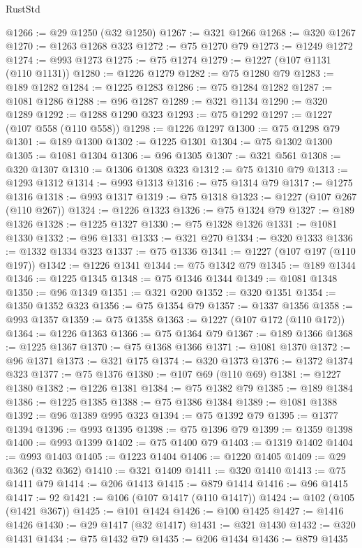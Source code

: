 \begin{lexlean}{RustStd}
\begin{coremodule}
@1266 := @29 @1250 (@32 @1250)
@1267 := @321 @1266
@1268 := @320 @1267
@1270 := @1263 @1268 @323
@1272 := @75 @1270 @79
@1273 := @1249 @1272
@1274 := @993 @1273
@1275 := @75 @1274
@1279 := @1227 (@107 @1131 (@110 @1131))
@1280 := @1226 @1279
@1282 := @75 @1280 @79
@1283 := @189 @1282
@1284 := @1225 @1283
@1286 := @75 @1284 @1282
@1287 := @1081 @1286
@1288 := @96 @1287
@1289 := @321 @1134
@1290 := @320 @1289
@1292 := @1288 @1290 @323
@1293 := @75 @1292
@1297 := @1227 (@107 @558 (@110 @558))
@1298 := @1226 @1297
@1300 := @75 @1298 @79
@1301 := @189 @1300
@1302 := @1225 @1301
@1304 := @75 @1302 @1300
@1305 := @1081 @1304
@1306 := @96 @1305
@1307 := @321 @561
@1308 := @320 @1307
@1310 := @1306 @1308 @323
@1312 := @75 @1310 @79
@1313 := @1293 @1312
@1314 := @993 @1313
@1316 := @75 @1314 @79
@1317 := @1275 @1316
@1318 := @993 @1317
@1319 := @75 @1318
@1323 := @1227 (@107 @267 (@110 @267))
@1324 := @1226 @1323
@1326 := @75 @1324 @79
@1327 := @189 @1326
@1328 := @1225 @1327
@1330 := @75 @1328 @1326
@1331 := @1081 @1330
@1332 := @96 @1331
@1333 := @321 @270
@1334 := @320 @1333
@1336 := @1332 @1334 @323
@1337 := @75 @1336
@1341 := @1227 (@107 @197 (@110 @197))
@1342 := @1226 @1341
@1344 := @75 @1342 @79
@1345 := @189 @1344
@1346 := @1225 @1345
@1348 := @75 @1346 @1344
@1349 := @1081 @1348
@1350 := @96 @1349
@1351 := @321 @200
@1352 := @320 @1351
@1354 := @1350 @1352 @323
@1356 := @75 @1354 @79
@1357 := @1337 @1356
@1358 := @993 @1357
@1359 := @75 @1358
@1363 := @1227 (@107 @172 (@110 @172))
@1364 := @1226 @1363
@1366 := @75 @1364 @79
@1367 := @189 @1366
@1368 := @1225 @1367
@1370 := @75 @1368 @1366
@1371 := @1081 @1370
@1372 := @96 @1371
@1373 := @321 @175
@1374 := @320 @1373
@1376 := @1372 @1374 @323
@1377 := @75 @1376
@1380 := @107 @69 (@110 @69)
@1381 := @1227 @1380
@1382 := @1226 @1381
@1384 := @75 @1382 @79
@1385 := @189 @1384
@1386 := @1225 @1385
@1388 := @75 @1386 @1384
@1389 := @1081 @1388
@1392 := @96 @1389 @995 @323
@1394 := @75 @1392 @79
@1395 := @1377 @1394
@1396 := @993 @1395
@1398 := @75 @1396 @79
@1399 := @1359 @1398
@1400 := @993 @1399
@1402 := @75 @1400 @79
@1403 := @1319 @1402
@1404 := @993 @1403
@1405 := @1223 @1404
@1406 := @1220 @1405
@1409 := @29 @362 (@32 @362)
@1410 := @321 @1409
@1411 := @320 @1410
@1413 := @75 @1411 @79
@1414 := @206 @1413
@1415 := @879 @1414
@1416 := @96 @1415
@1417 := 92
@1421 := @106 (@107 @1417 (@110 @1417))
@1424 := @102 (@105 (@1421 @367))
@1425 := @101 @1424
@1426 := @100 @1425
@1427 := @1416 @1426
@1430 := @29 @1417 (@32 @1417)
@1431 := @321 @1430
@1432 := @320 @1431
@1434 := @75 @1432 @79
@1435 := @206 @1434
@1436 := @879 @1435

\end{coremodule}
\end{lexlean}
